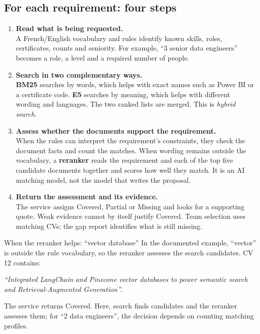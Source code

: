 \documentclass[11pt,a4paper]{article}
\begin{document}
\subsection{For each requirement: four steps}
\begin{enumerate}[leftmargin=1.6em,itemsep=8pt]
\item \textbf{Read what is being requested.}\\
A French/English vocabulary and rules identify known skills, roles, certificates, counts and seniority. For example, ``3 senior data engineers'' becomes a role, a level and a required number of people.

\item \textbf{Search in two complementary ways.}\\
\textbf{BM25} searches by words, which helps with exact names such as Power BI or a certificate code. \textbf{E5} searches by meaning, which helps with different wording and languages. The two ranked lists are merged. This is \emph{hybrid search}.

\item \textbf{Assess whether the documents support the requirement.}\\
When the rules can interpret the requirement's constraints, they check the document facts and count the matches. When wording remains outside the vocabulary, a \textbf{reranker} reads the requirement and each of the top five candidate documents together and scores how well they match. It is an AI matching model, not the model that writes the proposal.

\item \textbf{Return the assessment and its evidence.}\\
The service assigns Covered, Partial or Missing and looks for a supporting quote. Weak evidence cannot by itself justify Covered. Team selection uses matching CVs; the gap report identifies what is still missing.
\end{enumerate}

\begin{say}{When the reranker helps: ``vector database''}
In the documented example, ``vector'' is outside the rule vocabulary, so the reranker assesses the search candidates. CV 12 contains:

\textit{``Integrated LangChain and Pinecone vector databases to power semantic search and Retrieval-Augmented Generation''.}

The service returns Covered. Here, search finds candidates and the reranker assesses them; for ``2 data engineers'', the decision depends on counting matching profiles.
\end{say}
\end{document}
